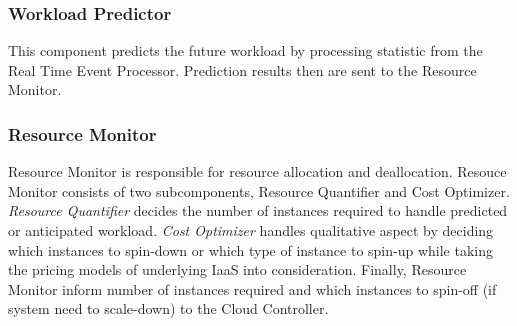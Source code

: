 \subsubsection{Workload Predictor}
This component predicts the future workload by processing statistic from the Real Time Event Processor. Prediction results then are sent to the Resource Monitor.

\subsubsection{Resource Monitor}
Resource Monitor is responsible for resource allocation and deallocation. Resouce Monitor consists of two subcomponents, Resource Quantifier and Cost Optimizer. \textit{Resource Quantifier} decides the number of instances required to handle predicted or anticipated workload. \textit{Cost Optimizer} handles qualitative aspect by deciding which instances to spin-down or which type of instance to spin-up while taking the pricing models of underlying IaaS into consideration. Finally, Resource Monitor inform number of instances required and which instances to spin-off (if system need to scale-down) to the Cloud Controller.